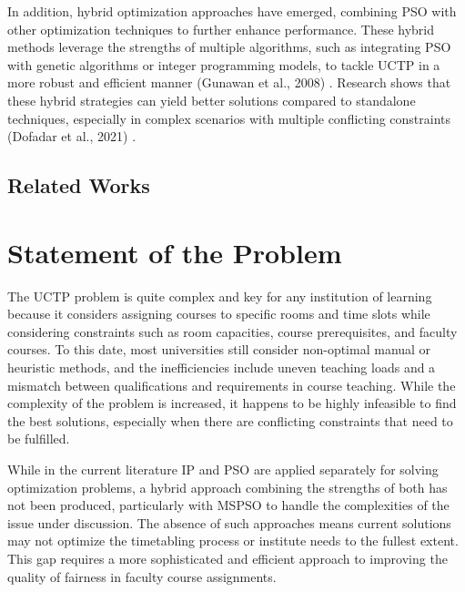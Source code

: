 \documentclass{article}
\newenvironment{subs}
  {\adjustwidth{3em}{0pt}}
  {\endadjustwidth}
\begin{document}
\begin{subs}
    In addition, hybrid optimization approaches have emerged, combining PSO with other optimization techniques to further enhance performance. These hybrid methods leverage the strengths of multiple algorithms, such as integrating PSO with genetic algorithms or integer programming models, to tackle UCTP in a more robust and efficient manner (Gunawan et al., 2008) \cite{Gunawan2008-ga}. Research shows that these hybrid strategies can yield better solutions compared to standalone techniques, especially in complex scenarios with multiple conflicting constraints (Dofadar et al., 2021) \cite{Dofadar2021-ha}.
    
    \subsection{Related Works}
    \label{subsec:relatedworks}
    
    
    \end{subs}
    

\end{subs}
\section{Statement of the Problem}
\label{sec:problemstatement}

The UCTP problem is quite complex and key for any institution of learning because it considers assigning courses to specific rooms and time slots while considering constraints such as room capacities, course prerequisites, and faculty courses. \cite{Arratia-Martinez2021-io} To this date, most universities still consider non-optimal manual or heuristic methods, and the inefficiencies include uneven teaching loads and a mismatch between qualifications and requirements in course teaching. \cite{Oswald_C2013-zo} While the complexity of the problem is increased, it happens to be highly infeasible to find the best solutions, especially when there are conflicting constraints that need to be fulfilled. 

While in the current literature IP\cite{Arratia-Martinez2021-io} \cite{Torres2021-ir}  and PSO \cite{Oswald_C2013-zo} \cite{Ali2014-mb} are applied separately for solving optimization problems, a hybrid approach combining the strengths of both has not been produced, particularly with MSPSO \cite{XIA2018126} to handle the complexities of the issue under discussion. The absence of such approaches means current solutions may not optimize the timetabling process or institute needs to the fullest extent. This gap requires a more sophisticated and efficient approach to improving the quality of fairness in faculty course assignments. 
\end{document}
